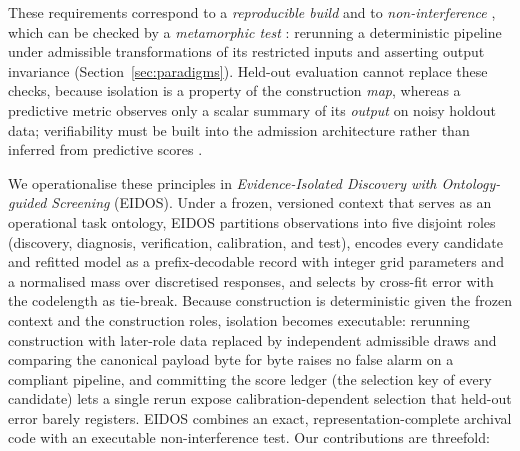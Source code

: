 These requirements correspond to a \emph{reproducible build} \citep{lamb2022reproducible} and to \emph{non-interference} \citep{goguen1982noninterference,sabelfeld2003ifc}, which can be checked by a \emph{metamorphic test} \citep{chen2018metamorphic}: rerunning a deterministic pipeline under admissible transformations of its restricted inputs and asserting output invariance (Section~\ref{sec:paradigms}). Held-out evaluation cannot replace these checks, because isolation is a property of the construction \emph{map}, whereas a predictive metric observes only a scalar summary of its \emph{output} on noisy holdout data; verifiability must be built into the admission architecture rather than inferred from predictive scores \citep{cornelio2026verification}.

We operationalise these principles in \emph{Evidence-Isolated Discovery with Ontology-guided Screening} (EIDOS). Under a frozen, versioned context that serves as an operational task ontology, EIDOS partitions observations into five disjoint roles (discovery, diagnosis, verification, calibration, and test), encodes every candidate and refitted model as a prefix-decodable record with integer grid parameters and a normalised mass over discretised responses, and selects by cross-fit error with the codelength as tie-break. Because construction is deterministic given the frozen context and the construction roles, isolation becomes executable: rerunning construction with later-role data replaced by independent admissible draws and comparing the canonical payload byte for byte raises no false alarm on a compliant pipeline, and committing the score ledger (the selection key of every candidate) lets a single rerun expose calibration-dependent selection that held-out error barely registers. EIDOS combines an exact, representation-complete archival code with an executable non-interference test. Our contributions are threefold:
